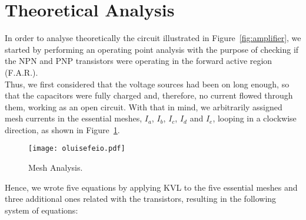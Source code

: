 \section{Theoretical Analysis}
\label{sec:analysis}

In order to analyse theoretically the circuit illustrated in Figure~\ref{fig:amplifier}, we started by performing an operating point analysis with the purpose of checking if the NPN and PNP transistors were operating in the forward active region (F.A.R.). \\

Thus, we first considered that the voltage sources had been on long enough, so that the capacitors were fully charged and, therefore, no current flowed through them, working as an open circuit. With that in mind, we arbitrarily assigned mesh currents in the essential meshes, $I_a$, $I_b$, $I_c$, $I_d$ and $I_e$, looping in a clockwise direction, as shown in Figure~\ref{fig:mesh}.

\vspace{-4mm}

\begin{figure}[H] \centering
\texttt{[image: oluisefeio.pdf]}
\caption{Mesh Analysis.}
\label{fig:mesh}
\end{figure}

Hence, we wrote five equations by applying KVL to the five essential meshes and three additional ones related with the transistors, resulting in the following system of equations:

